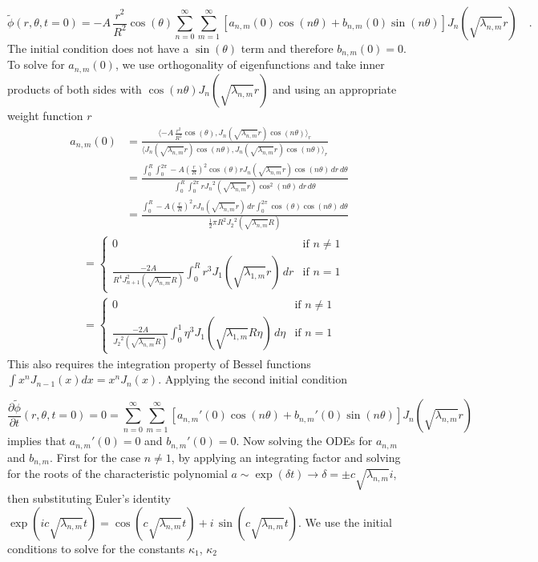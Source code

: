 \documentclass{homework}
\begin{document}
\[ \tilde{\phi}(r, \theta , t=0) = -A \, \frac{r^2}{R^2} \cos(\theta) \sum^\infty_{n=0} \sum^\infty_{m=1} [a_{n,m}(0) \cos(n \theta) + b_{n,m}(0) \sin(n \theta) ] J_n (\sqrt{\lambda_{n,m}} r) \quad .\]
\noindent
The initial condition does not have a $\sin(\theta)$ term and therefore $b_{n,m}(0) = 0$. To solve for $a_{n,m}(0)$, we use orthogonality of eigenfunctions and take inner products of both sides with $\cos(n \theta) J_n(\sqrt{\lambda_{n,m}} r)$ and using an appropriate weight function $r$
\begin{align*}
a_{n,m}(0) &= \frac{\langle -A \, \frac{r^2}{R^2} \cos(\theta), J_n(\sqrt{\lambda_{n,m}} r) \cos(n \theta) \rangle_r}{\langle J_n(\sqrt{\lambda_{n,m}} r) \cos(n \theta), J_n(\sqrt{\lambda_{n,m}} r) \cos(n \theta) \rangle_r} \\
&= \frac{\int^R_0 \int^{2 \pi}_0 -A (\frac{r}{R})^2 \cos(\theta) r J_n (\sqrt{\lambda_{n,m}} r) \cos(n \theta) \, dr \, d \theta}{\int^R_0 \int^{2 \pi}_0 r {J_n}^2 (\sqrt{\lambda_{n,m}} r) \cos^2(n \theta) \, dr \, d \theta} \\
&= \frac{\int^R_0 -A (\frac{r}{R})^2 r J_n (\sqrt{\lambda_{n,m}} r) \, dr \int^{2 \pi}_0 \cos(\theta) \cos(n \theta) \, d \theta}{\frac{1}{2} \pi R^2 {J_2}^2 (\sqrt{\lambda_{n,m}} R)}
\end{align*}
\begin{align*}
    &= \begin{cases}
    0 & \textrm{if $n \neq 1$} \\
    \frac{-2A}{R^4 J_{n+1}^2 (\sqrt{\lambda_{n,m}} R)} \int^R_0 r^3 J_1 (\sqrt{\lambda_{1,m}} r) \, dr & \textrm{if $n = 1$}
    \end{cases} \\
    &= \begin{cases}
    0 & \textrm{if $n \neq 1$} \\
    \frac{-2A}{{J_2}^2 (\sqrt{\lambda_{n,m}} R)} \int^1_0 \eta^3 J_1 (\sqrt{\lambda_{1,m}} R \eta) \, d \eta & \textrm{if $n = 1$}
    \end{cases}
\end{align*}
\noindent
This also requires the integration property of Bessel functions $\int x^n J_{n-1}(x) dx = x^n J_n(x)$. Applying the second initial condition

\[ \frac{\partial \tilde{\phi}}{\partial t}(r, \theta , t=0) = 0 = \sum^\infty_{n=0} \sum^\infty_{m=1} [a_{n,m}'(0) \cos(n \theta) + b_{n,m}'(0) \sin(n \theta) ] J_n (\sqrt{\lambda_{n,m}} r) \]
\noindent
implies that $a_{n,m}'(0) = 0$ and $b_{n,m}'(0) = 0$. Now solving the ODEs for $a_{n,m}$ and $b_{n,m}$. First for the case $n \neq 1$, by applying an integrating factor and solving for the roots of the characteristic polynomial $a \sim \exp(\delta t) \rightarrow \delta = \pm c \sqrt{\lambda_{n,m}} i$, then substituting Euler's identity $\exp(i c \sqrt{\lambda_{n,m}} t) = \cos(c \sqrt{\lambda_{n,m}} t) + i \, \sin(c \sqrt{\lambda_{n,m}} t)$. We use the initial conditions to solve for the constants $\kappa_1$, $\kappa_2$
\end{document}

